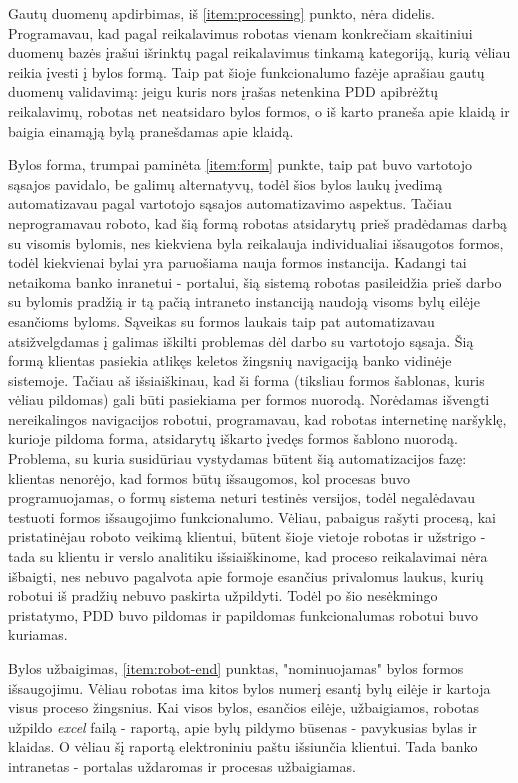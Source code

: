 \documentclass{VUMIFPSBakPrakAt}
\begin{document}
\par
Gautų duomenų apdirbimas, iš \ref{item:processing} punkto, nėra didelis. Programavau, kad pagal reikalavimus robotas vienam konkrečiam skaitiniui duomenų bazės įrašui išrinktų pagal reikalavimus tinkamą kategoriją, kurią vėliau reikia įvesti į bylos formą. Taip pat šioje funkcionalumo fazėje aprašiau gautų duomenų validavimą: jeigu kuris nors įrašas netenkina PDD apibrėžtų reikalavimų, robotas net neatsidaro bylos formos, o iš karto praneša apie klaidą ir baigia einamąją bylą pranešdamas apie klaidą.
\par
Bylos forma, trumpai paminėta \ref{item:form} punkte, taip pat buvo vartotojo sąsajos pavidalo, be galimų alternatyvų, todėl šios bylos laukų įvedimą automatizavau pagal vartotojo sąsajos automatizavimo aspektus. Tačiau neprogramavau roboto, kad šią formą robotas atsidarytų prieš pradėdamas darbą su visomis bylomis, nes kiekviena byla reikalauja individualiai išsaugotos formos, todėl kiekvienai bylai yra paruošiama nauja formos instancija. Kadangi tai netaikoma banko inranetui - portalui, šią sistemą robotas pasileidžia prieš darbo su bylomis pradžią ir tą pačią intraneto instanciją naudoją visoms bylų eilėje esančioms byloms. Sąveikas su formos laukais taip pat automatizavau atsižvelgdamas į galimas iškilti problemas dėl darbo su vartotojo sąsaja. Šią formą klientas pasiekia atlikęs keletos žingsnių navigaciją banko vidinėje sistemoje. Tačiau aš išsiaiškinau, kad ši forma (tiksliau formos šablonas, kuris vėliau pildomas) gali būti pasiekiama per formos nuorodą. Norėdamas išvengti nereikalingos navigacijos robotui, programavau, kad robotas internetinę naršyklę, kurioje pildoma forma, atsidarytų iškarto įvedęs formos šablono nuorodą. Problema, su kuria susidūriau vystydamas būtent šią automatizacijos fazę: klientas nenorėjo, kad formos būtų išsaugomos, kol procesas buvo programuojamas, o formų sistema neturi testinės versijos, todėl negalėdavau testuoti formos išsaugojimo funkcionalumo. Vėliau, pabaigus rašyti procesą, kai pristatinėjau roboto veikimą klientui, būtent šioje vietoje robotas ir užstrigo - tada su klientu ir verslo analitiku išsiaiškinome, kad proceso reikalavimai nėra išbaigti, nes nebuvo pagalvota apie formoje esančius privalomus laukus, kurių robotui iš pradžių nebuvo paskirta užpildyti. Todėl po šio nesėkmingo pristatymo, PDD buvo pildomas ir papildomas funkcionalumas robotui buvo kuriamas.
\par
Bylos užbaigimas, \ref{item:robot-end} punktas, "nominuojamas" bylos formos išsaugojimu. Vėliau robotas ima kitos bylos numerį esantį bylų eilėje ir kartoja visus proceso žingsnius. Kai visos bylos, esančios eilėje, užbaigiamos, robotas užpildo \textit{excel} failą - raportą, apie bylų pildymo būsenas - pavykusias bylas ir klaidas. O vėliau šį raportą elektroniniu paštu išsiunčia klientui. Tada banko intranetas - portalas uždaromas ir procesas užbaigiamas.
\end{document}

